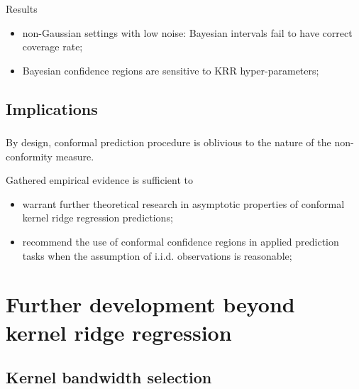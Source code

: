 \documentclass[t]{beamer}  %
\begin{document}
\begin{frame}[t]\frametitle{\insertsection}
  \framesubtitle{\insertsubsection}
  \begin{block}{Results}
    \begin{itemize}
      \item non-Gaussian settings with low noise: Bayesian intervals fail to have
      correct coverage rate;
      \item Bayesian confidence regions are sensitive to KRR hyper-parameters;
    \end{itemize}
  \end{block}
\end{frame}


\subsection{Implications} %
\label{sub:implications}

\begin{frame}[c]\frametitle{\insertsection}
  \framesubtitle{\insertsubsection}
  By design, conformal prediction procedure is oblivious to the nature of
  the non-conformity measure.

  \vspace{\baselineskip}
  Gathered empirical evidence is sufficient to \begin{itemize}
    \item warrant further theoretical research in asymptotic properties of conformal
    kernel ridge regression predictions;
    \item recommend the use of conformal confidence regions in applied prediction
    tasks when the assumption of i.i.d. observations is reasonable;
  \end{itemize}
\end{frame}



\section{Further development beyond kernel ridge regression} %
\label{sec:further_development_beyond_krr}

\subsection{Kernel bandwidth selection} %
\label{sub:kernel_bandwidth_selection}
\end{document}
